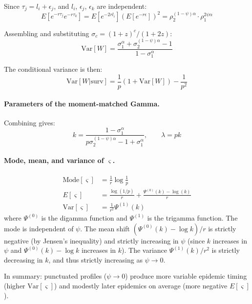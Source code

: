 \documentclass[10pt]{article}
\begin{document}
Since $\tau_j = l_i + \epsilon_j$, and $l_i$, $\epsilon_j$, $\epsilon_k$ are independent:
\begin{equation}
	E[e^{-r \tau_j} e^{-r \tau_k}] = E[e^{-2r l_i}] (E[e^{-r \epsilon}])^2 = \rho_2^{(1-\psi)\alpha} \cdot \rho_1^{2 \psi \alpha}
\end{equation}

Assembling and substituting $\sigma_c = (1 + z)^c/(1 + 2z)$:
\begin{equation}
	\text{Var}[W] = \frac{\sigma_1^\alpha + \sigma_2^{(1-\psi)\alpha} - 1}{1 - \sigma_1^\alpha}
\end{equation}

The conditional variance is then:
\begin{equation}
	\text{Var}[W | \text{surv}] = \frac{1}{p} (1 + \text{Var}[W]) - \frac{1}{p^2}
\end{equation}

\paragraph{Parameters of the moment-matched Gamma.} Combining gives:
\begin{equation}
	k = \frac{1 - \sigma_1^\alpha}{p \sigma_2^{(1 - \psi)\alpha} - 1 + \sigma_1^\alpha},
	\qquad
	\lambda = p k
\end{equation}

\paragraph{Mode, mean, and variance of $\varsigma$.}
\begin{align}
	\text{Mode}[\varsigma] &= \frac{1}{r} \log \frac{1}{p} \\[6pt]
	E[\varsigma] &= \frac{\log(1/p)}{r} + \frac{\Psi^{(0)}(k) - \log(k)}{r} \\[6pt]
	\text{Var}[\varsigma] &= \frac{1}{r^2} \Psi^{(1)}(k)
\end{align}
where $\Psi^{(0)}$ is the digamma function and $\Psi^{(1)}$ is the trigamma function. The mode is independent of $\psi$. The mean shift $(\Psi^{(0)}(k) - \log k)/r$ is strictly negative (by Jensen's inequality) and strictly increasing in $\psi$ (since $k$ increases in $\psi$ and $\Psi^{(0)}(k) - \log k$ increases in $k$). The variance $\Psi^{(1)}(k)/r^2$ is strictly decreasing in $k$, and thus strictly increasing as $\psi \to 0$.

In summary: punctuated profiles ($\psi \to 0$) produce more variable epidemic timing (higher $\text{Var}[\varsigma]$) and modestly later epidemics on average (more negative $E[\varsigma]$).
\end{document}
